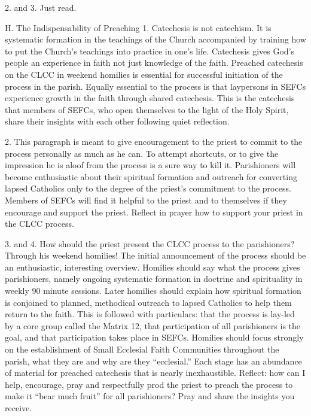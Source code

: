 \documentclass[oneside]{book}
\begin{document}
2. and 3.  Just read.

H. The Indispensability of Preaching
1. Catechesis is not catechism. It is systematic formation in the teachings of
the Church accompanied by training how to put the Church's teachings into
practice in one's life. Catechesis gives God's people an experience in faith not
just knowledge of the faith. Preached catechesis on the CLCC in weekend homilies
is essential for successful initiation of the process in the parish. Equally
essential to the process is that laypersons in SEFCs experience growth in the
faith through shared catechesis. This is the catechesis that members of SEFCs,
who open themselves to the light of the Holy Spirit, share their insights with
each other following quiet reflection.

2. This paragraph is meant to give encouragement to the priest to commit to the
process personally as much as he can. To attempt shortcuts, or to give the
impression he is aloof from the process is a sure way to kill it. Parishioners
will become enthusiastic about their spiritual formation and outreach for
converting lapsed Catholics only to the degree of the priest's commitment to the
process. Members of SEFCs will find it helpful to the priest and to themselves
if they encourage and support the priest. Reflect in prayer how to support your
priest in the CLCC process.

3. and 4. How should the priest present the CLCC process to the parishioners?
Through his weekend homilies! The initial announcement of the process should be
an enthusiastic, interesting overview. Homilies should say what the process
gives parishioners, namely ongoing systematic formation in doctrine and
spirituality in weekly 90 minute sessions. Later homilies should explain how
spiritual formation is conjoined to planned, methodical outreach to lapsed
Catholics to help them return to the faith.
This is followed with particulars: that the process is lay-led by a core group
called the Matrix 12, that participation of all parishioners is the goal, and
that participation takes place in SEFCs. Homilies should focus strongly on the
establishment of Small Ecclesial Faith Communities throughout the parish, what
they are and why are they ``ecclesial.'' Each stage has an abundance of material
for preached catechesis that is nearly inexhaustible.
Reflect: how can I help, encourage, pray and respectfully prod the priest to
preach the process to make it ``bear much fruit'' for all parishioners? Pray and
share the insights you receive.
\end{document}
